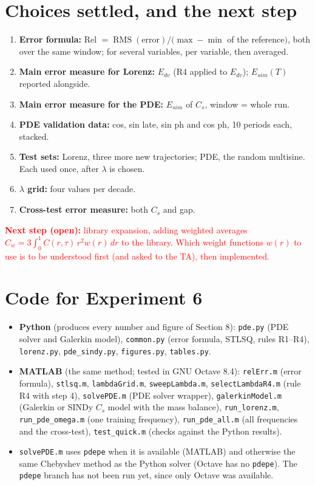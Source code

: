 \documentclass[11pt,a4paper]{article}
\newcommand{\RMS}{\operatorname{RMS}}
\begin{document}
\section{Choices settled, and the next step}
\begin{enumerate}
  \item \textbf{Error formula:} Rel $=\RMS(\text{error})/(\max-\min$ of the reference$)$, both over the same window; for several variables, per variable, then averaged.
  \item \textbf{Main error measure for Lorenz:} $E_{dv}$ (R4 applied to $E_{dv}$); $E_{sim}(T)$ reported alongside.
  \item \textbf{Main error measure for the PDE:} $E_{sim}$ of $C_s$, window = whole run.
  \item \textbf{PDE validation data:} cos, sin late, sin ph and cos ph, 10 periods each, stacked.
  \item \textbf{Test sets:} Lorenz, three more new trajectories; PDE, the random multisine. Each used once, after $\lambda$ is chosen.
  \item \textbf{$\lambda$ grid:} four values per decade.
  \item \textbf{Cross-test error measure:} both $C_s$ and gap.
\end{enumerate}
\textcolor{red}{\textbf{Next step (open):} library expansion, adding weighted averages $C_w = 3\int_0^1 C(r,\tau)\,r^2 w(r)\,dr$ to the library. Which weight functions $w(r)$ to use is to be understood first (and asked to the TA), then implemented.}

\appendix\sloppy
\section{Code for Experiment 6}
\begin{itemize}
  \item \textbf{Python} (produces every number and figure of Section 8): \texttt{pde.py} (PDE solver and Galerkin model), \texttt{common.py} (error formula, STLSQ, rules R1--R4), \texttt{lorenz.py}, \texttt{pde\_sindy.py}, \texttt{figures.py}, \texttt{tables.py}.
  \item \textbf{MATLAB} (the same method; tested in GNU Octave 8.4): \texttt{relErr.m} (error formula), \texttt{stlsq.m}, \texttt{lambdaGrid.m}, \texttt{sweepLambda.m}, \texttt{selectLambdaR4.m} (rule R4 with step 4), \texttt{solvePDE.m} (PDE solver wrapper), \texttt{galerkinModel.m} (Galerkin or SINDy $C_s$ model with the mass balance), \texttt{run\_lorenz.m}, \texttt{run\_pde\_omega.m} (one training frequency), \texttt{run\_pde\_all.m} (all frequencies and the cross-test), \texttt{test\_quick.m} (checks against the Python results).
  \item \texttt{solvePDE.m} uses \texttt{pdepe} when it is available (MATLAB) and otherwise the same Chebyshev method as the Python solver (Octave has no \texttt{pdepe}). The \texttt{pdepe} branch has not been run yet, since only Octave was available.
\end{itemize}
\end{document}
